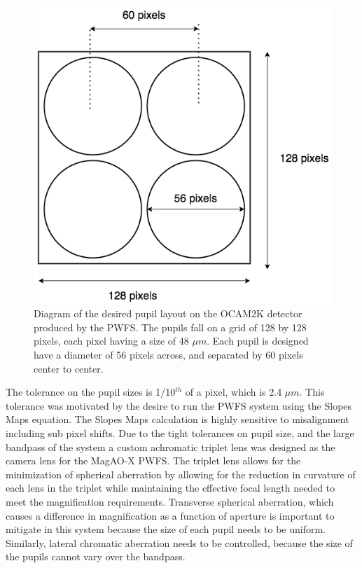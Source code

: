 \begin{figure}
    \centering
    \includegraphics[width=.5\textwidth]{Chapter Materials/Chapter Three Materials/MagAOXpupils.png}
    \caption{Diagram of the desired pupil layout on the OCAM$2$K detector produced by the PWFS. The pupils fall on a grid of 128 by 128 pixels, each pixel having a size of 48 $\mu m$. Each pupil is designed have a diameter of 56 pixels across, and separated by 60 pixels center to center.}
    \label{fig:PWFSpupils}
\end{figure}
    
The tolerance on the pupil sizes is 1/10$^{th}$ of a pixel, which is 2.4 $\mu m$. This tolerance was motivated by the desire to run the PWFS system using the Slopes Maps equation. The Slopes Maps calculation is highly sensitive to misalignment including sub pixel shifts. Due to the tight tolerances on pupil size, and the large bandpass of the system a custom achromatic triplet lens was designed as the camera lens for the MagAO-X PWFS. The triplet lens allows for the minimization of spherical aberration by allowing for the reduction in curvature of each lens in the triplet while maintaining the effective focal length needed to meet the magnification requirements. Transverse spherical aberration, which causes a difference in magnification as a function of aperture is important to mitigate in this system because the size of each pupil needs to be uniform. Similarly, lateral chromatic aberration needs to be controlled, because the size of the pupils cannot vary over the bandpass.
	
	
